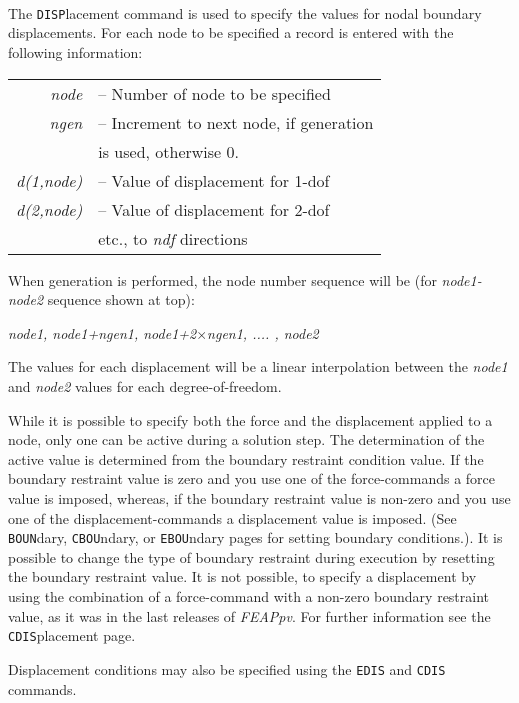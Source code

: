  \\{\smallskip}
 \\{\smallskip}
 \\{\smallskip}
\headb

The {\tt DISP}lacement command is used to specify the values for
nodal boundary displacements.
For each node to be specified a record is entered with the
following information:

\begin{center}
\begin{tabular}{r l}
\it node      &-- Number of node to be specified \\
\it ngen      &-- Increment to next node, if generation \\
              &\quad is used, otherwise 0. \\
\it d(1,node) &-- Value of displacement for 1-dof \\
\it d(2,node) &-- Value of displacement for 2-dof \\
              &\quad etc., to {\it ndf} directions \\
\end{tabular}
\end{center}
When generation is performed, the node number sequence will be
(for {\it node1-node2} sequence shown at top):

\begin{center}
{\it node1, node1+ngen1, node1+2$\times$ngen1, .... , node2}
\end{center}

The values for each displacement will be a linear
interpolation between the {\it node1} and {\it node2} values for
each degree-of-freedom.

While it is possible to specify both the force and the displacement applied
to a node, only one can be active during a solution step.  The determination
of the active value is determined from the boundary
restraint condition value.  If the boundary restraint value is zero
and you use one of the force-commands a force
value is imposed, whereas, if the boundary restraint value is non-zero
and you use one of the displacement-commands a
displacement value is imposed. (See {\tt BOUN}dary, {\tt CBOU}ndary,
or {\tt EBOU}ndary pages for setting boundary
conditions.).  It is possible to change the type of boundary restraint
during execution by resetting the boundary restraint value. It is not
possible, to specify a displacement by using the combination of a 
force-command with a non-zero boundary restraint value, as it was
in the last releases of {\sl FEAPpv}. For further information see the
{\tt CDIS}placement page.

Displacement conditions may also be specified using the {\tt EDIS}
and {\tt CDIS} commands.
\vfil\eject

